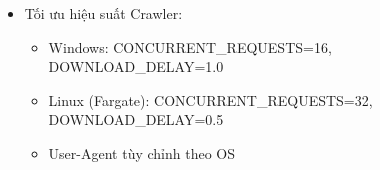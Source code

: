 \begin{itemize}
  \begin{quote}
  Tổng thể các chỉ số ở mức khiêm tốn (dưới 0.5) do prompt RAG được cấu
  hình trả lời chi tiết, diễn giải đầy đủ \(\rightarrow\) làm giảm
  cosine similarity khi Ragas dịch ngược thành câu hỏi.
  \end{quote}
\item
  Tối ưu hiệu suất Crawler:

  \begin{itemize}
  \tightlist
  \item
    Windows: CONCURRENT\_REQUESTS=16, DOWNLOAD\_DELAY=1.0
  \item
    Linux (Fargate): CONCURRENT\_REQUESTS=32, DOWNLOAD\_DELAY=0.5
  \item
    User-Agent tùy chỉnh theo OS
  \end{itemize}
\end{itemize}
